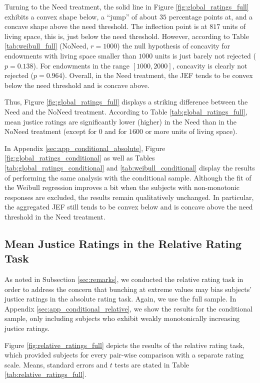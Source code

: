 \documentclass[12pt]{scrartcl}
\begin{document}
Turning to the Need treatment, the solid line in Figure \ref{fig:global_ratings_full} exhibits a convex shape below, a ``jump'' of about $35$ percentage points at, and a concave shape above the need threshold.
The inflection point is at $817$ units of living space, this is, just below the need threshold.
However, according to Table \ref{tab:weibull_full} (NoNeed, $r=1000$) the null hypothesis of concavity for endowments with living space smaller than $1000$ units is just barely not rejected ($p=0.138$).
For endowments in the range $[1000,2000]$, concavity is clearly not rejected ($p=0.964$).
Overall, in the Need treatment, the JEF tends to be convex below the need threshold and is concave above.

Thus, Figure \ref{fig:global_ratings_full} displays a striking difference between the Need and the NoNeed treatment.
According to Table \ref{tab:global_ratings_full}, mean justice ratings are significantly lower (higher) in the Need than in the NoNeed treatment (except for $0$ and for $1600$ or more units of living space).

In Appendix \ref{sec:app_conditional_absolute}, Figure \ref{fig:global_ratings_conditional} as well as Tables \ref{tab:global_ratings_conditional} and \ref{tab:weibull_conditional} display the results of performing the same analysis with the conditional sample.
Although the fit of the Weibull regression improves a bit when the subjects with non-monotonic responses are excluded, the results remain qualitatively unchanged.
In particular, the aggregated JEF still tends to be convex below and is concave above the need threshold in the Need treatment.


\subsection{Mean Justice Ratings in the Relative Rating Task}\label{sec:relative}
As noted in Subsection \ref{sec:remarks}, we conducted the relative rating task in order to address the concern that bunching at extreme values may bias subjects' justice ratings in the absolute rating task.
Again, we use the full sample.
In Appendix \ref{sec:app_conditional_relative}, we show the results for the conditional sample, only including subjects who exhibit weakly monotonically increasing justice ratings.

Figure \ref{fig:relative_ratings_full} depicts the results of the relative rating task, which provided subjects for every pair-wise comparison with a separate rating scale.
Means, standard errors and $t$ tests are stated in Table \ref{tab:relative_ratings_full}.
\end{document}
